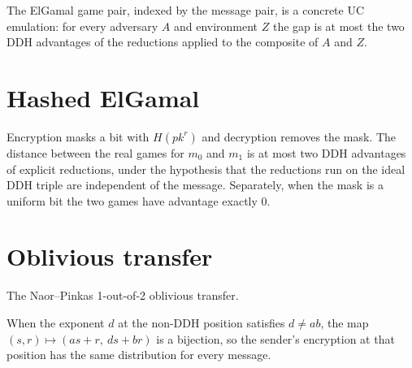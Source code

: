 \begin{theorem}
  \label{thm:elgamal-uc}
  \leanok
  The ElGamal game pair, indexed by the message pair, is a concrete UC emulation:
  for every adversary $A$ and environment $Z$ the gap is at most the two DDH
  advantages of the reductions applied to the composite of $A$ and $Z$.
\end{theorem}

\section{Hashed ElGamal}

\begin{theorem}
  \label{thm:hashed-elgamal}
  \leanok
  Encryption masks a bit with $H(\mathit{pk}^r)$ and decryption removes the mask.
  The distance between the real games for $m_0$ and $m_1$ is at most two DDH
  advantages of explicit reductions, under the hypothesis that the reductions run
  on the ideal DDH triple are independent of the message. Separately, when the
  mask is a uniform bit the two games have advantage exactly $0$.
\end{theorem}

\section{Oblivious transfer}

The Naor--Pinkas 1-out-of-2 oblivious transfer.

\begin{theorem}
  \label{thm:ot-sender}
  \leanok
  When the exponent $d$ at the non-DDH position satisfies $d \neq ab$, the map
  $(s, r) \mapsto (as + r,\ ds + br)$ is a bijection, so the sender's encryption
  at that position has the same distribution for every message.
\end{theorem}

